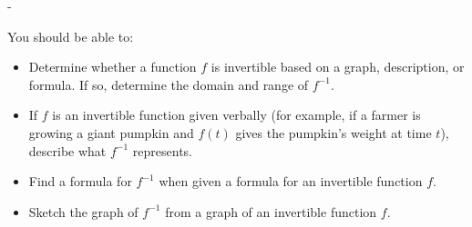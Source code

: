 \documentclass{article}
\makeatletter
\newlength{\tipmargin}
\renewenvironment{framed}{
  \setlength{\tipmargin}{\textwidth-\linewidth}
  \advance\@totalleftmargin-\tipmargin
  \def\FrameCommand{\hspace{\tipmargin}\fbox}%
  \advance\linewidth\tipmargin
  \MakeFramed {\advance\hsize-\width \FrameRestore}%
}
{\endMakeFramed}
\makeatother
\begin{document}

\begin{problemonly}
  \begin{framed}

You should be able to:
    \begin{itemize}[topsep=0pt,partopsep=0pt,parsep=8pt,itemsep=0pt]

    \item Determine whether a function $f$ is invertible based on a graph,
      description, or formula. If so, determine the domain and range of $f^{-1}$. 

    \item If $f$ is an invertible function given verbally (for example, if a farmer is growing a giant pumpkin and $f(t)$ gives the pumpkin's weight at time $t$), describe what $f^{-1}$ represents. 

    \item Find a formula for $f^{-1}$ when given a formula for an invertible function $f$.

    \item Sketch the graph of $f^{-1}$ from a graph of an invertible function $f$.

    \end{itemize}
  \end{framed}
\end{problemonly}
\end{document}
